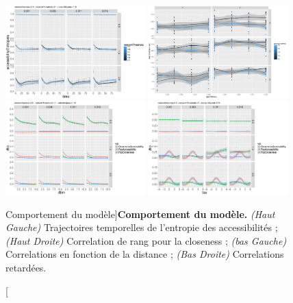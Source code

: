 \begin{figure}
	\includegraphics[width=0.48\textwidth]{Figures/MacroCoEvolExplo/accessibilityEntropies_networkGamma2_5_networkThreshold21_networkSpeed110}
	\includegraphics[width=0.48\textwidth]{Figures/MacroCoEvolExplo/rankCorrCloseness_synthRankSize1_5_networkSpeed10}\\
	\includegraphics[width=0.48\textwidth]{Figures/MacroCoEvolExplo/distcorrs_networkGamma2_5_networkThreshold11_networkSpeed110}
	\includegraphics[width=0.48\textwidth]{Figures/MacroCoEvolExplo/laggedcorrs_networkGamma2_5_networkThreshold11_networkSpeed110}
	\caption[][Comportement du modèle]{}{\textbf{Comportement du modèle.} \textit{(Haut Gauche)} Trajectoires temporelles de l'entropie des accessibilités ; \textit{(Haut Droite)} Correlation de rang pour la closeness ; \textit{(bas Gauche)} Correlations en fonction de la distance ; \textit{(Bas Droite)} Correlations retardées.}
\end{figure}



























